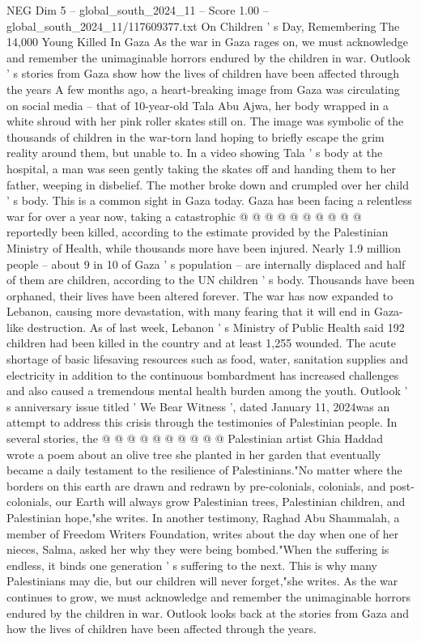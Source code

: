 \begin{textsample}{NEG Dim 5 – global\_south\_2024\_11 – Score 1.00 – global\_south\_2024\_11/117609377.txt}  \label{ex:f5_neg_424}
On Children ' s Day, Remembering The 14,000 Young Killed In Gaza As the war in Gaza rages on, we must acknowledge and remember the unimaginable horrors endured by the children in war.
Outlook ' s stories from Gaza show how the lives of children have been affected through the years A few months ago, a heart-breaking image from Gaza was circulating on social media -- that of 10-year-old Tala Abu Ajwa, her body wrapped in a white shroud with her pink roller skates still on.
The image was symbolic of the thousands of children in the war-torn land hoping to briefly escape the grim reality around them, but unable to.
In a video showing Tala ' s body at the hospital, a man was seen gently taking the skates off and handing them to her father, weeping in disbelief.
The mother broke down and crumpled over her child ' s body.
This is a common sight in Gaza today.
Gaza has been facing a relentless war for over a year now, taking a catastrophic @ @ @ @ @ @ @ @ @ @ reportedly been killed, according to the estimate provided by the Palestinian Ministry of Health, while thousands more have been injured.
Nearly 1.9 million people -- about 9 in 10 of Gaza ' s population -- are internally displaced and half of them are children, according to the UN children ' s body.
Thousands have been orphaned, their lives have been altered forever.
The war has now expanded to Lebanon, causing more devastation, with many fearing that it will end in Gaza-like destruction.
As of last week, Lebanon ' s Ministry of Public Health said 192 children had been killed in the country and at least 1,255 wounded.
The acute shortage of basic lifesaving resources such as food, water, sanitation supplies and electricity in addition to the continuous bombardment has increased challenges and also caused a tremendous mental health burden among the youth.
Outlook ' s anniversary issue titled ' We Bear Witness ', dated January 11, 2024was an attempt to address this crisis through the testimonies of Palestinian people.
In several stories, the @ @ @ @ @ @ @ @ @ @ Palestinian artist Ghia Haddad wrote a poem about an olive tree she planted in her garden that eventually became a daily testament to the resilience of Palestinians."No matter where the borders on this earth are drawn and redrawn by pre-colonials, colonials, and post-colonials, our Earth will always grow Palestinian trees, Palestinian children, and Palestinian hope,"she writes.
In another testimony, Raghad Abu Shammalah, a member of Freedom Writers Foundation, writes about the day when one of her nieces, Salma, asked her why they were being bombed."When the suffering is endless, it binds one generation ' s suffering to the next.
This is why many Palestinians may die, but our children will never forget,"she writes.
As the war continues to grow, we must acknowledge and remember the unimaginable horrors endured by the children in war.
Outlook looks back at the stories from Gaza and how the lives of children have been affected through the years.

\end{textsample}
